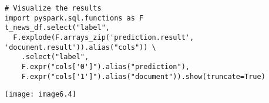 \documentclass[]{article}
\begin{document}
\clearpage

\begin{verbatim}
# Visualize the results
import pyspark.sql.functions as F
t_news_df.select("label",
  F.explode(F.arrays_zip('prediction.result', 'document.result')).alias("cols")) \
    .select("label",
	F.expr("cols['0']").alias("prediction"),
	F.expr("cols['1']").alias("document")).show(truncate=True)
\end{verbatim}
\texttt{[image: image6.4]} 
\end{document}
